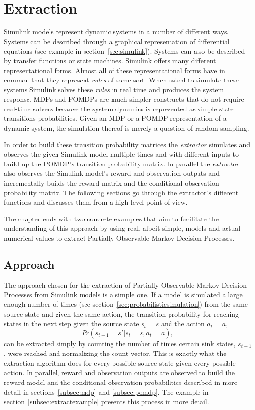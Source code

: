 \section{Extraction}

Simulink models represent dynamic systems in a number of different ways. Systems can be described through a graphical representation of differential equations (see example in section~\ref{sec:simulink}). Systems can also be described by transfer functions or state machines. Simulink offers many different representational forms. Almost all of these representational forms have in common that they represent \textit{rules} of some sort. When asked to simulate these systems Simulink solves these \textit{rules} in real time and produces the system response. MDPs and POMDPs are much simpler constructs that do not require real-time solvers because the system dynamics is represented as simple state transitions probabilities. Given an MDP or a POMDP representation of a dynamic system, the simulation thereof is merely a question of random sampling.

In order to build these transition probability matrices the \textit{extractor} simulates and observes the given Simulink model multiple times and with different inputs to build up the POMDP's transition probability matrix. In parallel the \textit{extractor} also observes the Simulink model's reward and observation outputs and incrementally builds the reward matrix and the conditional observation probability matrix. The following sections go through the extractor's different functions and discusses them from a high-level point of view.

The chapter ends with two concrete examples that aim to facilitate the understanding of this approach by using real, albeit simple, models and actual numerical values to extract Partially Observable Markov Decision Processes.

\subsection{Approach}
\label{subsec:approach}

The approach chosen for the extraction of Partially Observable Markov Decision Processes from Simulink models is a simple one. If a model is simulated a large enough number of times (see section~\ref{sec:probabilisticsimulation}) from the same source state and given the same action, the transition probability for reaching states in the next step given the source state $s_t = s$ and the action $a_t = a$,
\[
Pr(s_{t+1} = s'|s_t = s, a_t = a),
\]
can be extracted simply by counting the number of times certain sink states, $s_{t+1}$, were reached and normalizing the count vector. This is exactly what the extraction algorithm does for every possible source state given every possible action. In parallel, reward and observation outputs are observed to build the reward model and the conditional observation probabilities described in more detail in sections~\ref{subsec:mdp} and \ref{subsec:pomdp}. The example in section~\ref{subsec:extractexample} presents this process in more detail.

